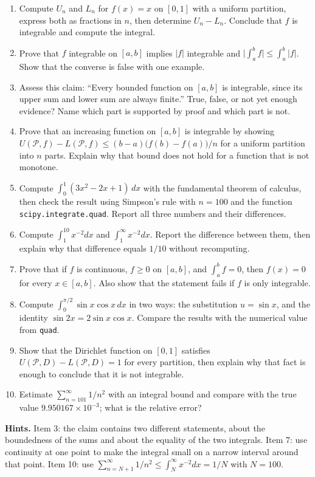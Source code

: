 \begin{latihan}
\begin{enumerate}
  \item Compute $U_n$ and $L_n$ for $f(x)=x$ on $[0,1]$ with a uniform partition,
        express both as fractions in $n$, then determine $U_n-L_n$. Conclude
        that $f$ is integrable and compute the integral.
  \item Prove that $f$ integrable on $[a,b]$ implies $|f|$ integrable
        and $\bigl|\int_a^bf\bigr|\le\int_a^b|f|$. Show that the converse is false with
        one example.
  \item Assess this claim: ``Every bounded function on $[a,b]$ is integrable, since its
        upper sum and lower sum are always finite.'' True, false, or not yet
        enough evidence? Name which part is supported by proof and which part is
        not.
  \item Prove that an increasing function on $[a,b]$ is integrable by showing
        $U(\mathcal{P},f)-L(\mathcal{P},f)\le(b-a)\bigl(f(b)-f(a)\bigr)/n$ for
        a uniform partition into $n$ parts. Explain why that bound does not hold for
        a function that is not monotone.
  \item Compute $\int_0^1(3x^2-2x+1)\,dx$ with the fundamental theorem of calculus, then check
        the result using Simpson's rule with $n=100$ and the function
        \texttt{scipy.integrate.quad}. Report all three numbers and their differences.
  \item Compute $\int_1^{10}x^{-2}dx$ and $\int_1^{\infty}x^{-2}dx$. Report the difference
        between them, then explain why that difference equals $1/10$ without
        recomputing.
  \item Prove that if $f$ is continuous, $f\ge0$ on $[a,b]$, and $\int_a^bf=0$, then
        $f(x)=0$ for every $x\in[a,b]$. Also show that the statement fails
        if $f$ is only integrable.
  \item Compute $\int_0^{\pi/2}\sin x\cos x\,dx$ in two ways: the substitution
        $u=\sin x$, and the identity $\sin2x=2\sin x\cos x$. Compare the results with
        the numerical value from \texttt{quad}.
  \item Show that the Dirichlet function on $[0,1]$ satisfies
        $U(\mathcal{P},D)-L(\mathcal{P},D)=1$ for every partition, then explain
        why that fact is enough to conclude that it is not integrable.
  \item Estimate $\sum_{n=101}^{\infty}1/n^2$ with an integral bound and compare with
        the true value $9.950167\times10^{-3}$; what is the relative error?
\end{enumerate}

\noindent\textbf{Hints.} Item 3: the claim contains two different statements, about
the boundedness of the sums and about the equality of the two integrals. Item 7: use
continuity at one point to make the integral small on a narrow interval around
that point. Item 10: use $\sum_{n=N+1}^\infty1/n^2\le\int_N^\infty x^{-2}dx=1/N$
with $N=100$.
\end{latihan}

